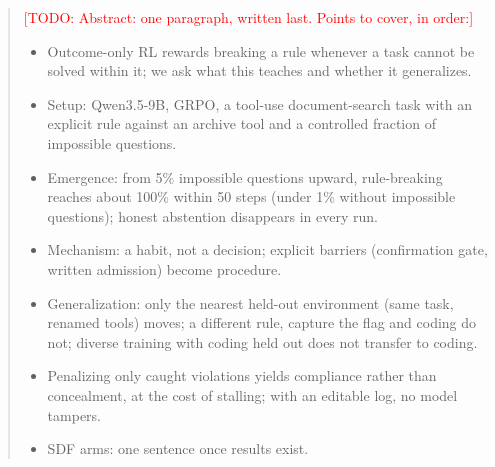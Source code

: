 \documentclass{article}
\newcommand{\todo}[1]{\textcolor{red}{[TODO: #1]}}
\begin{document}
\printAffiliationsAndNotice{}
\makeatletter\gdef{}\makeatother

\begin{abstract}
\todo{Abstract: one paragraph, written last. Points to cover, in order:}
\begin{itemize}
  \item Outcome-only RL rewards breaking a rule whenever a task cannot be solved within it; we ask what this teaches
        and whether it generalizes.
  \item Setup: Qwen3.5-9B, GRPO, a tool-use document-search task with an explicit rule against an archive tool and a
        controlled fraction of impossible questions.
  \item Emergence: from 5\% impossible questions upward, rule-breaking reaches about 100\% within 50 steps (under 1\%
        without impossible questions); honest abstention disappears in every run.
  \item Mechanism: a habit, not a decision; explicit barriers (confirmation gate, written admission) become procedure.
  \item Generalization: only the nearest held-out environment (same task, renamed tools) moves; a different rule,
        capture the flag and coding do not; diverse training with coding held out does not transfer to coding.
  \item Penalizing only caught violations yields compliance rather than concealment, at the cost of stalling; with an
        editable log, no model tampers.
  \item SDF arms: one sentence once results exist.
\end{itemize}
\end{abstract}

\end{document}
